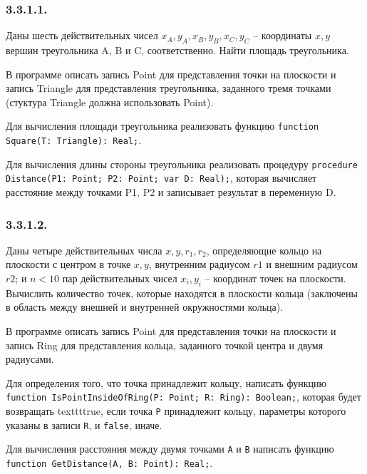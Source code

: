 \documentclass[12pt,a4paper]{report}
\begin{document}
\parindent=1cm
\pagestyle{empty}

\lstset{ language=Pascal, basicstyle=\small\ttfamily, numbers=left, numberstyle=\tiny, stepnumber=1, numbersep=5pt, extendedchars=\true, showstringspaces=false, breakatwhitespace=true, frame=single, keepspaces=true }

\clearpage

\subsubsection{ 3.3.1.1. } Даны шесть действительных чисел $x_A, y_A, x_B, y_B, x_C, y_C$ -- координаты $x, y$ вершин треугольника A, B и C, соответственно. Найти площадь треугольника.

В программе описать запись Point для представления точки на плоскости и запись Triangle для представления треугольника, заданного тремя точками (стуктура Triangle должна использовать Point).

Для вычисления площади треугольника реализовать функцию \texttt{function Square(T: Triangle): Real;}.

Для вычисления длины стороны треугольника реализовать процедуру \texttt{procedure Distance(P1: Point; P2: Point; var D: Real);},
которая вычисляет расстояние между точками P1, P2 и записывает результат в переменную D.


\subsubsection{ 3.3.1.2. } Даны четыре действительных числа $x, y, r_1, r_2$, определяющие кольцо на плоскости с центром в точке $x, y$, внутренним радиусом $r1$ и внешним радиусом $r2$; и $n < 10$ пар действительных чисел $x_i, y_i$ -- координат точек на плоскости. Вычислить количество точек, которые находятся в плоскости кольца (заключены в область между внешней и внутренней окружностями кольца).

В программе описать запись Point для представления точки на плоскости и запись Ring для представления кольца, заданного точкой центра и двумя радиусами.

Для определения того, что точка принадлежит кольцу, написать функцию \texttt{function IsPointInsideOfRing(P: Point; R: Ring): Boolean;}, которая будет возвращать texttt{true}, если точка \texttt{P} принадлежит кольцу, параметры которого указаны в записи \texttt{R}, и \texttt{false}, иначе.

Для вычисления расстояния между двумя точками \texttt{A} и \texttt{B} написать функцию \texttt{function GetDistance(A, B: Point): Real;}.
\end{document}
